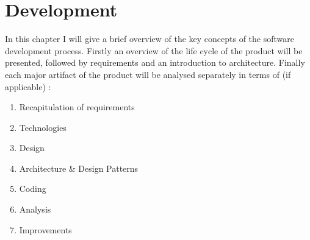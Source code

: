 \chapter{Development}

	\normalsize
	{
		In this chapter I will give a brief overview of the key concepts of the software development process.
		Firstly an overview of the life cycle of the product will be presented, followed by requirements and an introduction to architecture.
		Finally each major artifact of the product will be analysed separately in terms of (if applicable) :
		
		\begin{enumerate}[itemsep=1pt,parsep=1pt]
			\item Recapitulation of requirements
			\item Technologies
			\item Design
			\item Architecture \& Design Patterns
			\item Coding 
			\item Analysis
			\item Improvements
		\end{enumerate} 		
	}

	
	
		
	
	
		
	
	
	
	
	
	
	
	
	

		

	


	
	
	